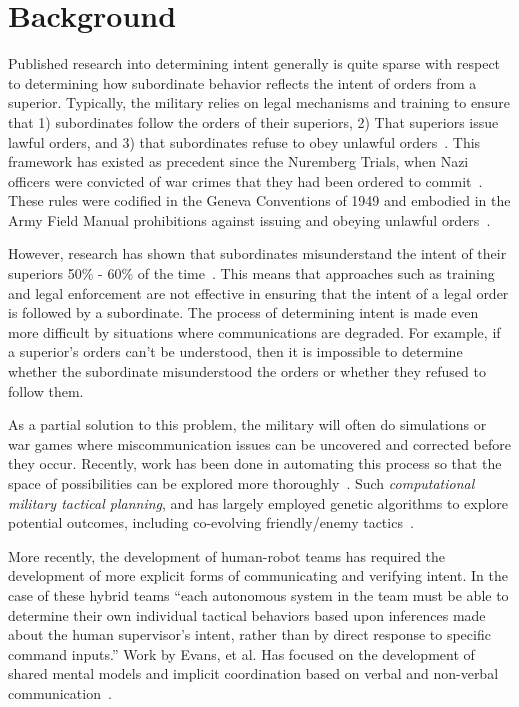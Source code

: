 \documentclass[11pt,dvipdfm]{article}
\begin{document}
\section{Background}
Published research into determining intent generally is quite sparse with respect to determining how subordinate behavior reflects the intent of orders from a superior. Typically, the military relies on legal mechanisms and training to ensure that 1) subordinates follow the orders of their superiors, 2) That superiors issue lawful orders, and 3) that subordinates refuse to obey unlawful orders~\cite{hoff2001obeying}. This framework has existed as precedent since the Nuremberg Trials, when Nazi officers were convicted of war crimes that they had been ordered to commit~\cite{taylor2012anatomy}. These rules were codified in the Geneva Conventions of 1949 and embodied in the Army Field Manual prohibitions against issuing and obeying unlawful orders~\cite{Army_field_manual_1956}.

However, research has shown that subordinates misunderstand the intent of their superiors 50\% - 60\% of the time~\cite{shattuck2000communication}. This means that approaches such as training and legal enforcement are not effective in ensuring that the intent of a legal order is followed by a subordinate. The process of determining intent is made even more difficult by situations where communications are degraded. For example, if a superior's orders can't be understood, then it is impossible to determine whether the subordinate misunderstood the orders or whether they refused to follow them.

As a partial solution to this problem, the military will often do simulations or war games where miscommunication issues can be uncovered and corrected before they occur. Recently, work has been done in automating this process so that the space of possibilities can be explored more thoroughly~\cite{shattuck2000communication}. Such \textit{computational military tactical planning}, and has largely employed genetic algorithms to explore potential outcomes, including co-evolving friendly/enemy tactics~\cite{kewley2002computational}. 

More recently, the development of human-robot teams has required the development of more explicit forms of communicating and verifying intent. In the case of these hybrid teams \enquote{each autonomous system in the team must be able to determine their own individual tactical behaviors based upon inferences made about the human supervisor’s intent, rather than by direct response to specific command inputs.} Work by Evans, et al. Has focused on the development of shared mental models and implicit coordination based on verbal and non-verbal communication~\cite{evans2017future}.
\end{document}
